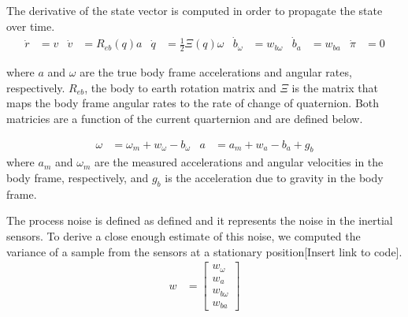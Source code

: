 \documentclass[]{article}
\begin{document}
{The derivative of the state vector is computed in order to propagate the state over time.
\begin{align}
	\dot{r} &= v
	&
	\dot{v} &= R_{eb}(q) a
	&
	\dot{q} &= \frac{1}{2}\Xi(q) \omega
	&
	\dot{b}_\omega &= w_{b\omega}
	&
	\dot{b}_a &= w_{ba}
	&
	\dot{\pi} &= 0
\end{align}

where $a$ and $\omega$ are the true body frame accelerations and angular rates, respectively.
$R_{eb}$, the body to earth rotation matrix and $\Xi$ is the matrix that maps the body frame angular rates to the rate of change of quaternion. Both matricies are a function of the current quarternion and are defined below.

\begin{align}
	\omega &= \omega_m + w_\omega - b_\omega &
	a &= a_m + w_a - b_a + g_b
\end{align}
where $a_m$ and $\omega_m$ are the measured accelerations and angular velocities in the body frame, respectively, and $g_b$ is the acceleration due to gravity in the body frame.

The process noise is defined as defined and it represents the noise in the inertial sensors. To derive a close enough estimate of this noise, we computed the variance of a sample from the sensors at a stationary position[Insert link to code].
\begin{align}
	w &= 
	\left[
	\begin{matrix}
		w_\omega \\
		w_a \\
		w_{b\omega} \\
		w_{ba}
	\end{matrix}
	\right]
\end{align}

}
\end{document}
